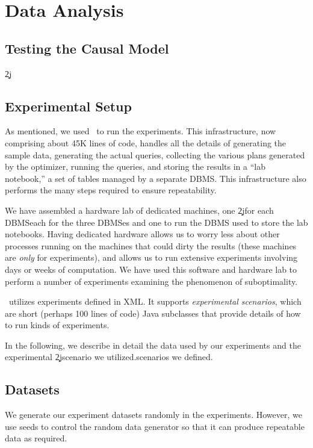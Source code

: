 \section{Data Analysis}
\subsection{Testing the Causal Model}

\c2j{}{\subsection{Experimental Setup}\label{sec:setup}}
As mentioned, we used \azdb\ to run the experiments. This infrastructure,
now comprising about 45K lines of code, handles all the details of
generating the sample data, generating the actual queries, collecting the
various plans generated by the optimizer, running the queries, and storing
the results in a ``lab notebook,'' a set of tables managed by
a separate DBMS. This infrastructure also performs the many steps
required to ensure repeatability.

We have assembled a hardware lab of dedicated
machines, one \c2j{for each DBMS}{each for the three DBMSes} and one to run the DBMS used
to store the lab notebooks. Having dedicated hardware allows us to worry
less about other processes running on the machines that could dirty the
results (these machines are {\em only} for experiments), and allows us to
run extensive experiments involving days or weeks of computation. We have
used this software and hardware lab to perform a number of experiments
examining the phenomenon of suboptimality.

\azdb\ utilizes experiments defined in XML. It supports {\em experimental
  scenarios}, which are short (perhaps 100 lines of code) Java subclasses
that provide details of how to run kinds of experiments.

In the following, we describe in detail the data used by our experiments and
the experimental \c2j{scenario we utilized.}{scenarios we defined.}

\subsection{Datasets}\label{sec:datasets}
We generate our experiment datasets randomly in the experiments. However, we
use seeds to control the random data generator so that it can produce
repeatable data as required.


